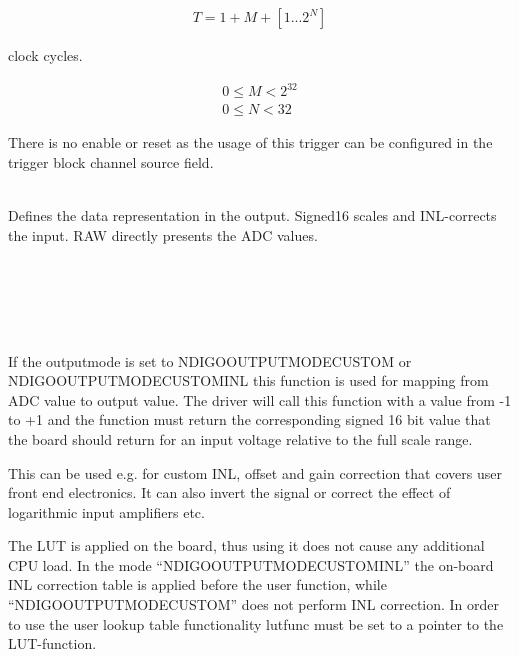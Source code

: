 			\begin{align}
				T = 1 + M + [1...2^N]
			\end{align}

			clock cycles.
			
			\begin{align}
				0 \leq M < 2^{32}\\
				0 \leq N < 32
			\end{align}					
		
			There is no enable or reset as the usage of this trigger can be configured in the trigger block channel source field.\par

			\\
			Defines the data representation in the output. Signed16 scales and INL-corrects the input. RAW directly presents the ADC values.\par
			
			\\
			\\
			\\
			\par
			
			\\
			If the \textsf{output\tu mode} is set to \textsf{NDIGO\tu OUTPUT\tu MODE\tu CUSTOM} or\\\textsf{NDIGO\tu OUTPUT\tu MODE\tu CUSTOM\tu INL} this function is used for mapping from ADC value to output value. The driver will call this function with a value from -1 to +1 and the function must return the corresponding signed 16 bit value that the board should return for an input voltage relative to the full scale range.\par

			 \par

			This can be used e.g. for custom INL, offset and gain correction that covers user front end electronics. It can also invert the signal or correct the effect of logarithmic input amplifiers etc.\par
			
			The LUT is applied on the board, thus using it does not cause any additional CPU load. In the mode ``\textsf{NDIGO\tu OUTPUT\tu MODE\tu CUSTOM\tu INL}'' the on-board INL correction table is applied before the user function, while ``\textsf{NDIGO\tu OUTPUT\tu MODE\tu CUSTOM}'' does not perform INL correction. In order to use the user lookup table functionality \textsf{lut\tu func} must be set to a pointer to the LUT-function.
		
